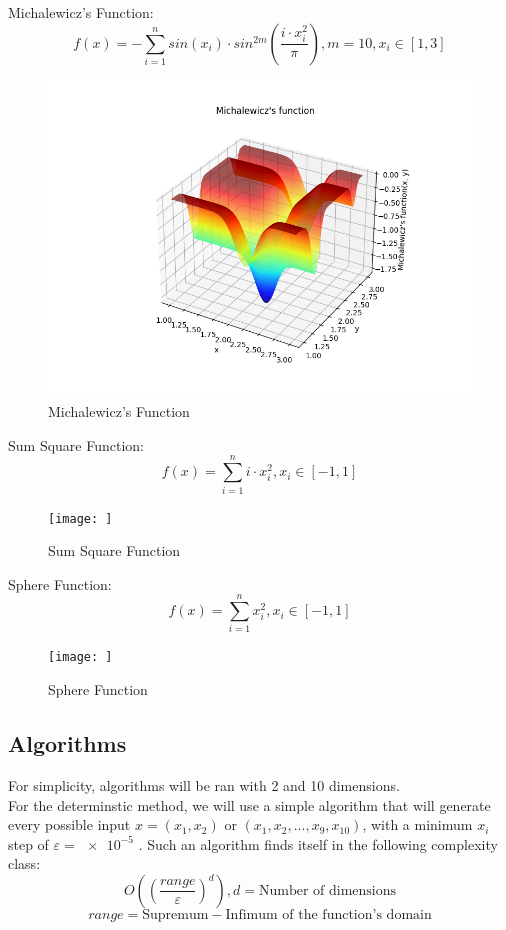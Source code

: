 \documentclass{article}
\begin{document}
Michalewicz's Function:
$$ f(x) = - \sum_{i=1}^n sin(x_i) \cdot sin^{2m}\left(\frac{i \cdot x_i^2}{\pi}\right),
m = 10, x_i \in \left[ 1, 3 \right]$$
\begin{figure}[!ht]
  \includegraphics[width=\textwidth,height=\textheight,keepaspectratio]{Michalewicz_function}
  \caption{Michalewicz's Function}
\end{figure}

Sum Square Function:
$$ f(x) = \sum_{i = 1}^n i \cdot x_i^2, x_i \in \left[ -1, 1 \right]$$
\begin{figure}[!ht]
  \texttt{[image: ]}
  \caption{Sum Square Function}
\end{figure}

Sphere Function:
$$ f(x) = \sum_{i = 1}^n x_i^2, x_i \in \left[ -1, 1 \right]$$
\begin{figure}[!ht]
  \texttt{[image: ]}
  \caption{Sphere Function}
\end{figure}

\subsection{Algorithms}
For simplicity, algorithms will be ran with 2 and 10 dimensions.
\\For the determinstic method, we will use a simple algorithm that will generate every possible input $x = (x_1, x_2)$ or $(x_1, x_2, ..., x_9, x_{10})$, with a minimum $x_i$ step of $\varepsilon = \num{e-5}$ . Such an algorithm finds itself in the following complexity class:
$$O\left(\left(\frac{range}{\varepsilon}\right)^d\right), d = \text{Number of dimensions}$$
$$range = \text{Supremum} - \text{Infimum of the function's domain} $$
\end{document}
